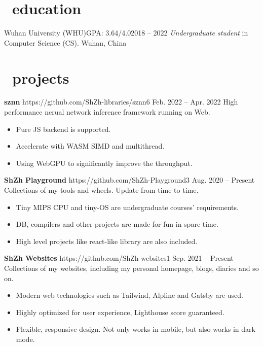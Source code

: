 \documentclass{common}
\begin{document}

\section{\faGraduationCap\ education}
\educationsubsection
    {Wuhan University (WHU)}{GPA: 3.64/4.0}{2018 -- 2022}
    {\textit{Undergraduate student} in Computer Science (CS). }{Wuhan, China}

\section{\faCubes\ projects}
\projectsubsection
    {\textbf{sznn}}
    {https://github.com/ShZh-libraries/sznn}{6}
    {Feb. 2022 -- Apr. 2022}
High performance nerual network inference framework running on Web.
\begin{itemize}
    \item Pure JS backend is supported.
    \item Accelerate with WASM SIMD and multithread.
    \item Using WebGPU to significantly improve the throughput.
\end{itemize}
\projectsubsection
    {\textbf{ShZh Playground}}
    {https://github.com/ShZh-Playground}{3}
    {Aug. 2020 -- Present}
Collections of my tools and wheels. Update from time to time.
\begin{itemize}
    \item Tiny MIPS CPU and tiny-OS are undergraduate courses' requirements.
    \item DB, compilers and other projects are made for fun in spare time.
    \item High level projects like react-like library are also included.
\end{itemize}
\projectsubsection
    {\textbf{ShZh Websites}}
    {https://github.com/ShZh-websites}{1}
    {Sep. 2021 -- Present}
Collections of my websites, including my personal homepage, blogs, diaries and so on.
\begin{itemize}
    \item Modern web technologies such as Tailwind, Alpline and Gatsby are used.
    \item Highly optimized for user experience, Lighthouse score guaranteed.
    \item Flexible, responsive design. Not only works in mobile, but also works in dark mode.
\end{itemize}
\end{document}
